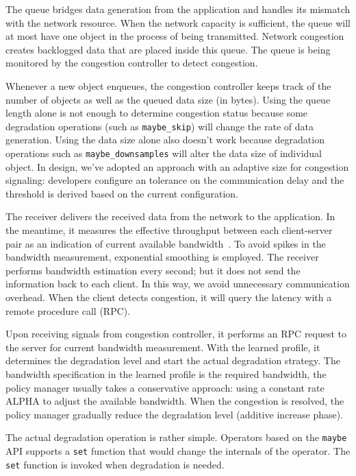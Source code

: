  The queue bridges data generation from the
application and handles its mismatch with the network resource. When the network
capacity is sufficient, the queue will at most have one object in the process of
being transmitted. Network congestion creates backlogged data that are placed
inside this queue. The queue is being monitored by the congestion controller to
detect congestion.

 Whenever a new object enqueues, the congestion
controller keeps track of the number of objects as well as the queued data size
(in bytes). Using the queue length alone is not enough to determine congestion
status because some degradation operations (such as \texttt{maybe\_skip}) will
change the rate of data generation. Using the data size alone also doesn't work
because degradation operations such as \texttt{maybe\_downsamples} will alter
the data size of individual object. In \sysname{} design, we've adopted an
approach with an adaptive size for congestion signaling: developers configure an
tolerance on the communication delay and the threshold is derived based on the
current configuration.

 The receiver delivers the received data from the
network to the application. In the meantime, it measures the effective
throughput between each client-server pair as an indication of current available
bandwidth~\cite{iperf}. To avoid spikes in the bandwidth measurement,
exponential smoothing is employed. The receiver performs bandwidth estimation
every second; but it does not send the information back to each client. In this
way, we avoid unnecessary communication overhead. When the client detects
congestion, it will query the latency with a remote procedure call (RPC).

 Upon receiving signals from congestion controller, it
performs an RPC request to the server for current bandwidth measurement. With
the learned profile, it determines the degradation level and start the actual
degradation strategy. The bandwidth specification in the learned profile is the
required bandwidth, the policy manager usually takes a conservative approach:
using a constant rate ALPHA to adjust the available bandwidth. When the
congestion is resolved, the policy manager gradually reduce the degradation
level (additive increase phase).

 The actual degradation operation is rather simple. Operators
based on the \texttt{maybe} API supports a \texttt{set} function that would
change the internals of the operator. The \texttt{set} function is invoked when
degradation is needed.

